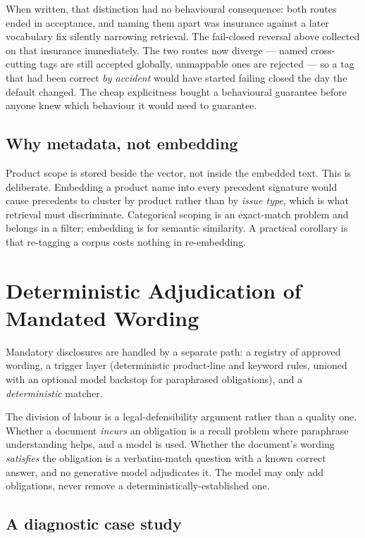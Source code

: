 \documentclass[10pt]{article}
\begin{document}
When written, that distinction had no behavioural consequence: both routes
ended in acceptance, and naming them apart was insurance against a later
vocabulary fix silently narrowing retrieval. The fail-closed reversal above
collected on that insurance immediately. The two routes now diverge --- named
cross-cutting tags are still accepted globally, unmappable ones are rejected ---
so a tag that had been correct \emph{by accident} would have started failing
closed the day the default changed. The cheap explicitness bought a behavioural
guarantee before anyone knew which behaviour it would need to guarantee.

\subsection{Why metadata, not embedding}

Product scope is stored beside the vector, not inside the embedded text. This
is deliberate. Embedding a product name into every precedent signature would
cause precedents to cluster by product rather than by \emph{issue type}, which
is what retrieval must discriminate. Categorical scoping is an exact-match
problem and belongs in a filter; embedding is for semantic similarity. A
practical corollary is that re-tagging a corpus costs nothing in re-embedding.

\section{Deterministic Adjudication of Mandated Wording}
\label{sec:disclosure}

Mandatory disclosures are handled by a separate path: a registry of approved
wording, a trigger layer (deterministic product-line and keyword rules, unioned
with an optional model backstop for paraphrased obligations), and a
\emph{deterministic} matcher.

The division of labour is a legal-defensibility argument rather than a quality
one. Whether a document \emph{incurs} an obligation is a recall problem where
paraphrase understanding helps, and a model is used. Whether the document's
wording \emph{satisfies} the obligation is a verbatim-match question with a
known correct answer, and no generative model adjudicates it. The model may
only add obligations, never remove a deterministically-established one.

\subsection{A diagnostic case study}
\end{document}
